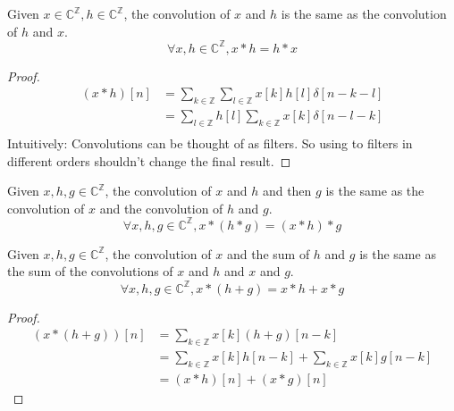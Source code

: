 
\begin{theorem}
     \label{thm:convolution-is-commutative}
    Given $x \in \mathbb{C}^{\mathbb{Z}}, h \in \mathbb{C}^{\mathbb{Z}}$, the convolution of $x$ and $h$ is the same as the convolution of $h$ and $x$.
    $$ \forall x, h \in \mathbb{C}^{\mathbb{Z}}, x * h = h * x $$
\end{theorem}

\begin{proof}
    \begin{align*}
        (x * h)[n] & = \sum_{k \in \mathbb{Z}}\sum_{l \in \mathbb{Z}} x[k]h[l] \delta[n-k-l] \\
                   & = \sum_{l \in \mathbb{Z}}h[l]\sum_{k \in \mathbb{Z}} x[k] \delta[n-l-k] \\
    \end{align*}
    Intuitively: Convolutions can be thought of as filters. So using to filters in different orders shouldn't change the final result.
\end{proof}

\begin{theorem}
     \label{thm:convolution-is-associative}
    Given $x, h, g \in \mathbb{C}^{\mathbb{Z}}$, the convolution of $x$ and $h$ and then $g$ is the same as the convolution of $x$ and the convolution of $h$ and $g$.
    $$ \forall x, h, g \in \mathbb{C}^{\mathbb{Z}}, x * (h * g) = (x * h) * g $$
\end{theorem}

\begin{theorem}
     \label{thm:convolution-is-distributive}
    Given $x, h, g \in \mathbb{C}^{\mathbb{Z}}$, the convolution of $x$ and the sum of $h$ and $g$ is the same as the sum of the convolutions of $x$ and $h$ and $x$ and $g$.
    $$ \forall x, h, g \in \mathbb{C}^{\mathbb{Z}}, x * (h + g) = x * h + x * g $$

\end{theorem}

\begin{proof}
    \begin{align*}
        (x * (h + g))[n] & = \sum_{k \in \mathbb{Z}} x[k](h + g)[n-k]                                \\
                         & = \sum_{k \in \mathbb{Z}} x[k]h[n-k] + \sum_{k \in \mathbb{Z}} x[k]g[n-k] \\
                         & = (x * h)[n] + (x * g)[n]
    \end{align*}
\end{proof}

